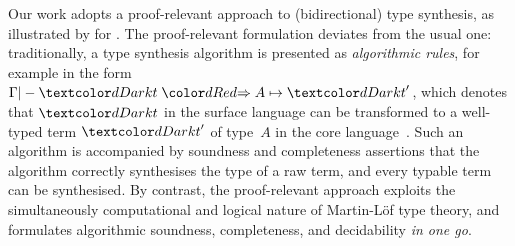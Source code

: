 Our work adopts a proof-relevant approach to (bidirectional) type synthesis, as illustrated by \citet{Wadler2022} for \PCF.
The proof-relevant formulation deviates from the usual one: traditionally, a type synthesis algorithm is presented as \emph{algorithmic rules}, for example in the form $\Gamma |- \isTerm{t} \syn A \mapsto \isTerm{t}'$, which denotes that $\isTerm{t}$ in the surface language
can be transformed to a well-typed term $\isTerm{t}'$ of type~$A$ in the core language~\cite{Pierce2000}.
Such an algorithm is accompanied by soundness and completeness assertions that the algorithm correctly synthesises the type of a raw term, and every typable term can be synthesised.
By contrast, the proof-relevant approach exploits the simultaneously computational and logical nature of Martin-L\"of type theory, and formulates algorithmic soundness, completeness, and decidability \emph{in one go}.

